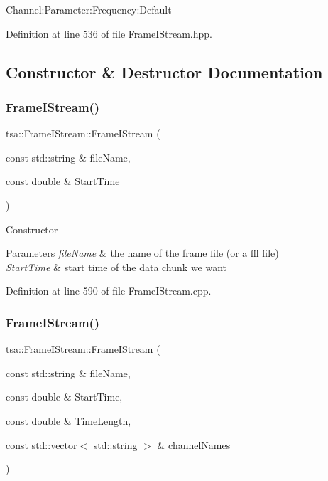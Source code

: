 Channel\+:\+Parameter\+:\+Frequency\+:Default 

Definition at line 536 of file Frame\+I\+Stream.\+hpp.



\subsection{Constructor \& Destructor Documentation}
\mbox{\label{classtsa_1_1_frame_i_stream_a5bd1cb2479b947745f39121ba638d23f}} 
\subsubsection{\texorpdfstring{Frame\+I\+Stream()}{FrameIStream()}\hspace{0.1cm}{\footnotesize\ttfamily [1/2]}}
{\footnotesize\ttfamily tsa\+::\+Frame\+I\+Stream\+::\+Frame\+I\+Stream (\begin{DoxyParamCaption}\item[{const std\+::string \&}]{file\+Name,  }\item[{const double \&}]{Start\+Time }\end{DoxyParamCaption})}

Constructor


\begin{DoxyParams}{Parameters}
{\em file\+Name} & the name of the frame file (or a ffl file) \\
\hline
{\em Start\+Time} & start time of the data chunk we want \\
\hline
\end{DoxyParams}


Definition at line 590 of file Frame\+I\+Stream.\+cpp.

\mbox{\label{classtsa_1_1_frame_i_stream_a12f14bd9445709d3f03dcb122dc89889}} 
\subsubsection{\texorpdfstring{Frame\+I\+Stream()}{FrameIStream()}\hspace{0.1cm}{\footnotesize\ttfamily [2/2]}}
{\footnotesize\ttfamily tsa\+::\+Frame\+I\+Stream\+::\+Frame\+I\+Stream (\begin{DoxyParamCaption}\item[{const std\+::string \&}]{file\+Name,  }\item[{const double \&}]{Start\+Time,  }\item[{const double \&}]{Time\+Length,  }\item[{const std\+::vector$<$ std\+::string $>$ \&}]{channel\+Names }\end{DoxyParamCaption})}

